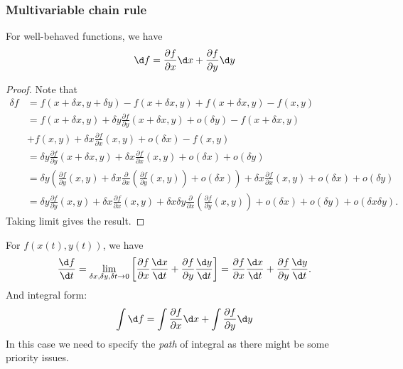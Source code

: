 \documentclass[a4paper]{article}
\begin{document}
        \subsubsection{Multivariable chain rule}
        \begin{theorem}\label{thm:mvchainrule}
            For well-behaved functions, we have 
            \begin{equation}
                \d f=\frac{\partial f}{\partial x} \d x+\frac{\partial f}{\partial y} \d y
            \end{equation}
        \end{theorem}
        \begin{proof}
            Note that 
            \[
                \begin{aligned}
                     \delta f &= f(x+\delta x, y+\delta y)-f(x+\delta x, y)+f(x+\delta x, y)-f(x,y)\\
                     &= f(x+\delta x,y)+\delta y \frac{\partial f}{\partial y}(x+\delta x, y)+o(\delta y)-f(x+\delta x,y)\\
                     &+ f(x,y)+\delta x \frac{\partial f}{\partial x}(x,y)+o(\delta x)-f(x,y) \\
                     &= \delta y \frac{\partial f}{\partial y}(x+\delta x, y)+\delta x \frac{\partial f}{\partial x}(x,y)+o(\delta x)+o(\delta y)\\
                     &= \delta y \left( \frac{\partial f}{\partial y}(x,y)+\delta x \frac{\partial }{\partial x}\left( \frac{\partial f}{\partial y}(x,y)  \right)+o(\delta x)   \right)+\delta x \frac{\partial f}{\partial x}(x,y)+o(\delta x)+o(\delta y)\\
                     &= \delta y \frac{\partial f}{\partial y}(x,y)+\delta x \frac{\partial f}{\partial x}(x,y)+\delta x \delta y \frac{\partial }{\partial x}\left( \frac{\partial f}{\partial y}(x,y)  \right)+o(\delta x)+o(\delta y)+o(\delta x \delta y).
                \end{aligned}
            \]
            Taking limit gives the result.
        \end{proof}
        \begin{remark}
            For $ f(x(t),y(t)) $, we have
            \begin{equation}
                \frac{\d f}{\d t}=\lim _{\delta x, \delta y, \delta t\to 0}\left[\frac{\partial f}{\partial x} \frac{\d x}{\d t}+\frac{\partial f}{\partial y} \frac{\d y}{\d t}\right] = \frac{\partial f}{\partial x} \frac{\d x}{\d t}+\frac{\partial f}{\partial y} \frac{\d y}{\d t}.
            \end{equation}
            And integral form:
            \begin{equation}
                \int \d f=\int \frac{\partial f}{\partial x} \d x+\int \frac{\partial f}{\partial y} \d y
            \end{equation}
            In this case we need to specify the \textit{path} of integral as there might be some priority issues.
        \end{remark}
\end{document}
